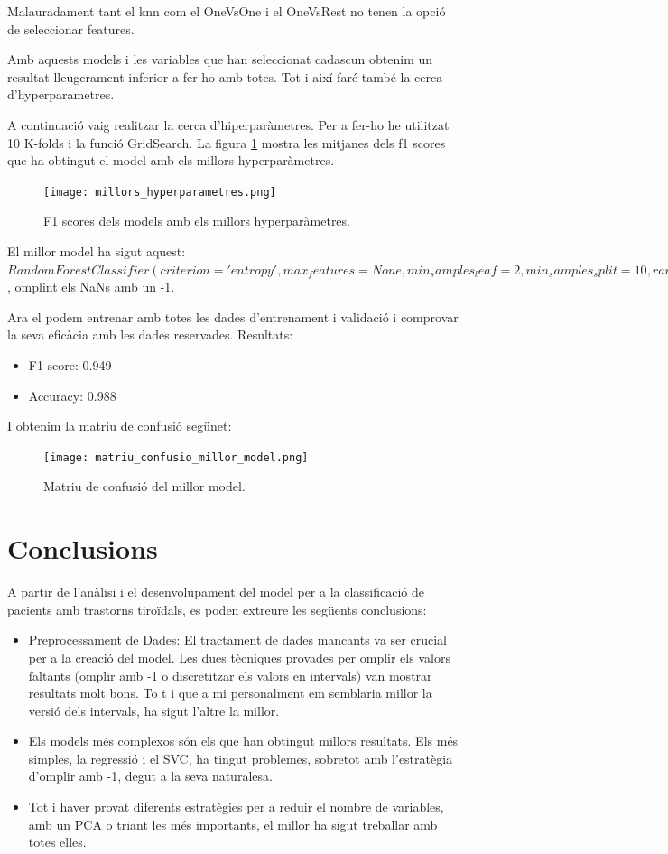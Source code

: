 \documentclass[9pt,a4paper,twoside]{tau-class/tau}
\begin{document}
    Malauradament tant el knn com el OneVsOne i el OneVsRest no tenen la opció de seleccionar features.

    Amb aquests models i les variables que han seleccionat cadascun obtenim un resultat lleugerament inferior a fer-ho amb totes. Tot i així faré també la cerca d'hyperparametres.

    A continuació vaig realitzar la cerca d'hiperparàmetres. Per a fer-ho he utilitzat 10 K-folds i la funció GridSearch. La figura \ref{fig:figure12} mostra les mitjanes dels f1 scores que ha obtingut el model amb els millors hyperparàmetres.


    \begin{figure}[H]
        \centering
        \texttt{[image: millors\_hyperparametres.png]}
        \caption{F1 scores dels models amb els millors hyperparàmetres.}
        \label{fig:figure12}
    \end{figure}
    
    El millor model ha sigut aquest: $RandomForestClassifier(criterion='entropy', max_features=None,
    min_samples_leaf=2, min_samples_split=10,
    random_state=20)$, omplint els NaNs amb un -1.

    Ara el podem entrenar amb totes les dades d'entrenament i validació i comprovar la seva eficàcia amb les dades reservades. Resultats:
    \begin{itemize}
        \item F1 score: 0.949
        \item Accuracy: 0.988
    \end{itemize}
    I obtenim la matriu de confusió segünet:
    \begin{figure}[H]
        \centering
        \texttt{[image: matriu\_confusio\_millor\_model.png]}
        \caption{Matriu de confusió del millor model.}
        \label{fig:figure13}
    \end{figure}

    \section{Conclusions}
    A partir de l'anàlisi i el desenvolupament del model per a la classificació de pacients amb trastorns tiroïdals, es poden extreure les següents conclusions:
    \begin{itemize}
        \item Preprocessament de Dades: El tractament de dades mancants va ser crucial per a la creació del model. Les dues tècniques provades per omplir els valors faltants (omplir amb -1 o discretitzar els valors en intervals) van mostrar resultats molt bons. To t i que a mi personalment em semblaria millor la versió dels intervals, ha sigut l'altre la millor.
        \item Els models més complexos són els que han obtingut millors resultats. Els més simples, la regressió i el SVC, ha tingut problemes, sobretot amb l'estratègia d'omplir amb -1, degut a la seva naturalesa.
        \item Tot i haver provat diferents estratègies per a reduir el nombre de variables, amb un PCA o triant les més importants, el millor ha sigut treballar amb totes elles.
    \end{itemize}
\end{document}
